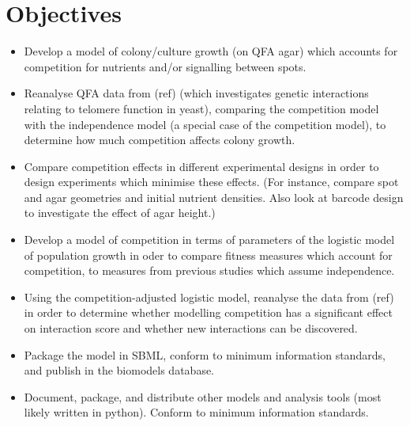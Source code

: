 
\section{Objectives}
\label{sec:objectives}

\begin{itemize}
\item Develop a model of colony/culture growth (on QFA agar) which accounts for
  competition for nutrients and/or signalling between spots.
\item Reanalyse QFA data from (ref) (which investigates genetic
  interactions relating to telomere function in yeast), comparing the
  competition model with the independence model (a special case of the
  competition model), to determine how much competition affects colony
  growth.
\item Compare competition effects in different experimental designs in
  order to design experiments which minimise these effects. (For
  instance, compare spot and agar geometries and initial nutrient
  densities. Also look at barcode design to investigate the effect of
  agar height.)
\item Develop a model of competition in terms of parameters of the
  logistic model of population growth in oder to compare fitness
  measures which account for competition, to measures from previous
  studies which assume independence.
\item Using the competition-adjusted logistic model, reanalyse the
  data from (ref) in order to determine whether modelling
  competition has a significant effect on interaction score and
  whether new interactions can be discovered.
\item Package the model in SBML, conform to minimum information
  standards, and publish in the biomodels database.
\item Document, package, and distribute other models and analysis
  tools (most likely written in python). Conform to minimum
  information standards.
\end{itemize}

